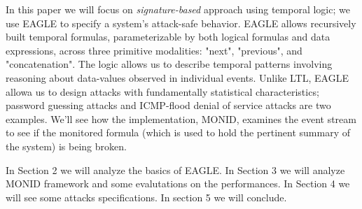 \documentclass[english]{article}
\begin{document}
In this paper we will focus on \textit{signature-based} approach using temporal logic; we use EAGLE\cite{barringer2004rule,barringer2003eagle} to specify a system's attack-safe behavior. EAGLE allows recursively built temporal formulas, parameterizable by both logical formulas and data expressions, across three primitive modalities: "next", "previous", and "concatenation". The logic allows us to describe temporal patterns involving reasoning about data-values observed in individual events. Unlike LTL, EAGLE allowa us to design attacks with fundamentally statistical characteristics; password guessing attacks and ICMP-flood denial of service attacks are two examples. 
We'll see how the implementation, MONID, examines the event stream to see if the monitored formula (which is used to hold the pertinent summary of the system) is being broken.

In Section 2 we will analyze the basics of EAGLE. In Section 3 we will analyze MONID framework and some evalutations on the performances. In Section 4 we will see some attacks specifications. In section 5 we will conclude.

\printbibliography
\end{document}
